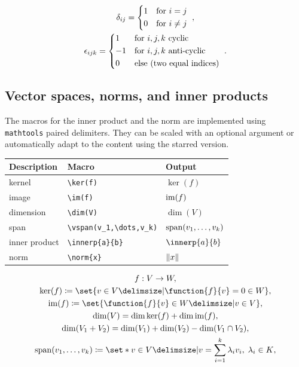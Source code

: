 \documentclass[DIV=13]{scrartcl}
\begin{document}
\begin{gather}
  \kronecker{ij} = \begin{dcases*}
    1 & for $i=j$     \\
    0 & for $i\neq j$
  \end{dcases*}, \\
  \leviciv{ijk} = \begin{dcases*}
    1  & for $i,j,k$ cyclic       \\
    -1 & for $i,j,k$ anti-cyclic  \\
    0  & else (two equal indices)
  \end{dcases*}.
\end{gather}


\subsection{Vector spaces, norms, and inner products}
The macros for the inner product and the norm are implemented using
\texttt{mathtools} paired delimiters. They can be scaled with an optional
argument or automatically adapt to the content using the starred version.
\begin{center}
  \begin{tabular}{lll}
    \toprule
    \textbf{Description} & \textbf{Macro}               & \textbf{Output} \\
    \midrule
    kernel               & \verb|\ker(f)|               & $\ker(f)$       \\
    image                & \verb|\im(f)|                & $\operatorname{im}(f)$        \\
    dimension            & \verb|\dim(V)|               & $\dim(V)$       \\
    span                 & \verb|\vspan(v_1,\dots,v_k)|
                         & $\operatorname{span}(v_1,\dots,v_k)$                        \\
    \midrule
    inner product        & \verb|\innerp{a}{b}|         & $\innerp{a}{b}$ \\
    norm                 & \verb|\norm{x}|              & $\lVert x\rVert$      \\
    \bottomrule
  \end{tabular}
\end{center}
\begin{gather}
  f : V \to W, \\
  \ker(f) \coloneq \set{v \in V \given \function{f}{v} = 0 \in W}, \\
  \im(f) \coloneq \set{\function{f}{v} \in W \given v \in V},  \\
  \dim(V) = \dim\ker(f) + \dim\im(f), \\
  \dim(V_1+V_2) = \dim(V_1) + \dim(V_2) - \dim(V_1\cap V_2), \\
  \vspan(v_1,\dots,v_k)\coloneq\set*{v\in V \given
    v=\sum_{i=1}^k\lambda_i v_i,\;\lambda_i\in K},
\end{gather}
\end{document}
